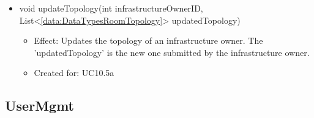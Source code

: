 \begin{description}
\begin{itemize}[noitemsep,nolistsep,leftmargin=-.25cm]
      \item \textsf{void updateTopology(int infrastructureOwnerID, List\textless{}\ref{data:DataTypesRoomTopology}\textgreater{} updatedTopology)}
        \begin{itemize}[noitemsep,nolistsep]
           \item Effect: Updates the topology of an infrastructure owner. The 'updatedTopology' is the new one submitted by the infrastructure owner.
\item Created for: UC10.5a
        \end{itemize}
    \end{itemize}
    \end{description}

  \subsection{UserMgmt}\label{int:OnlineServiceOnlineServiceUserManagerUserMgmt}
